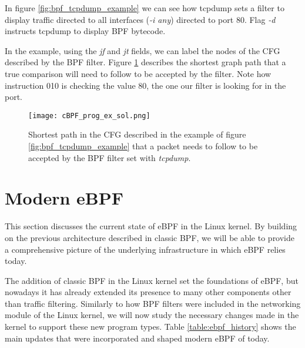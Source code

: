 In figure \ref{fig:bpf_tcpdump_example} we can see how tcpdump sets a filter to display traffic directed to all interfaces (\textit{-i any}) directed to port 80. Flag \textit{-d} instructs tcpdump to display BPF bytecode.

In the example, using the \textit{jf} and \textit{jt} fields, we can label the nodes of the CFG described by the BPF filter. Figure \ref{fig:tcpdump_ex_sol} describes the shortest graph path that a true comparison will need to follow to be accepted by the filter. Note how instruction 010 is checking the value 80, the one our filter is looking for in the port.

\begin{figure}[htbp]
	\centering
	\texttt{[image: cBPF\_prog\_ex\_sol.png]}
	\caption{Shortest path in the CFG described in the example of figure \ref{fig:bpf_tcpdump_example} that a packet needs to follow to be accepted by the BPF filter set with \textit{tcpdump}.}
	\label{fig:tcpdump_ex_sol}
\end{figure}

\section{Modern eBPF} \label{section:modern_ebpf}
This section discusses the current state of eBPF in the Linux kernel. By building on the previous architecture described in classic BPF, we will be able to provide a comprehensive picture of the underlying infrastructure in which eBPF relies today.

The addition of classic BPF in the Linux kernel set the foundations of eBPF, but nowadays it has already extended its presence to many other components other than traffic filtering. Similarly to how BPF filters were included in the networking module of the Linux kernel, we will now study the necessary changes made in the kernel to support these new program types. Table \ref{table:ebpf_history} shows the main updates that were incorporated and shaped modern eBPF of today.

